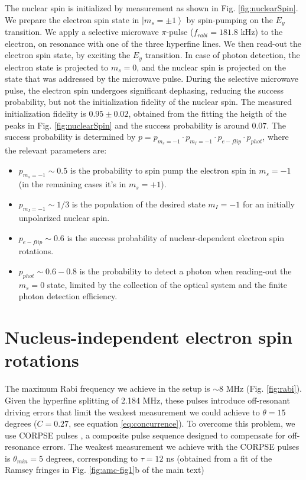 The nuclear spin is initialized by measurement \cite{Pfaff_NatPhys_2012} as shown in Fig. \ref{fig:nuclearSpin}. We prepare the electron spin state in $\left| m_s=\pm 1 \right \rangle$ by spin-pumping on the $E_{y}$ transition. We apply a selective microwave $\pi$-pulse ($f_{rabi} = 181.8$ kHz) to the electron, on resonance with one of the three hyperfine lines. We then read-out the electron spin state, by exciting the $E_y$ transition. In case of photon detection, the electron state is projected to $m_s=0$, and the nuclear spin is projected on the state that was addressed by the microwave pulse.
During the selective microwave pulse, the electron spin undergoes significant dephasing, reducing the success probability, but not the initialization fidelity of the nuclear spin. The measured initialization fidelity is $0.95 \pm 0.02$, obtained from the fitting the heigth of the peaks in Fig. \ref{fig:nuclearSpin}  and the success probability is around $0.07$. The success probability is determined by $p = p_{m_s=-1} \cdot p_{m_I=-1} \cdot p_{e-flip} \cdot p_{phot}$, where the relevant parameters are:
\begin{itemize}
 \item $p_{m_s=-1} \sim 0.5$ is the probability to spin pump the electron spin in $m_s=-1$ (in the remaining cases it's in $m_s = +1$).
 \item $p_{m_I=-1} \sim 1/3$ is the population of the desired state $m_I=-1$ for an initially unpolarized nuclear spin.
 \item $p_{e-flip} \sim 0.6$ is the success probability of nuclear-dependent electron spin rotations.
 \item $ p_{phot} \sim 0.6-0.8$ is the probability to detect a photon when reading-out the $m_s=0$ state, limited by the collection of the optical system and the finite photon detection efficiency.
\end{itemize}


\section {Nucleus-independent electron spin rotations}

The maximum Rabi frequency we achieve in the setup is $\sim 8$ MHz (Fig. \ref{fig:rabi}). Given the hyperfine splitting of 2.184 MHz, these pulses introduce off-resonant driving errors that limit the weakest measurement we could achieve to $\theta = 15$ degrees ($C = 0.27$, see equation \ref{eq:concurrence}). To overcome this problem, we use CORPSE pulses \cite{Cummins_PRA_2003}, a composite pulse sequence designed to compensate for off-resonance errors. The weakest measurement we achieve with the CORPSE pulses is $\theta_{min} = 5$ degrees, corresponding to $\tau = 12$ ns (obtained from a fit of the Ramsey fringes in Fig. \ref{fig:amc-fig1}b of the main text)

